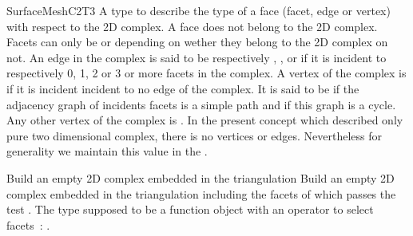 \begin{ccRefConcept}{SurfaceMeshC2T3}
{A type to describe the type of a face (facet, edge or vertex) with respect to 
the 2D complex. A  face does not belong to the 2D complex.
Facets can only be    or 
depending on wether they belong to the 2D complex on not.
An edge in the complex is said to be respectively , 
,
 or 
 if it is incident to respectively 0, 1, 2  or 3 or
more facets in the complex. A vertex of the complex is
 if it is incident incident to no edge of the complex.
It is said to be   
if the adjacency graph of incidents facets 
is a simple path  and  if this graph is  a cycle.
Any other vertex of the complex is .
In the present concept which described only pure two dimensional
complex,
there is no  vertices or edges. Nevertheless for generality
we maintain
this value in the .}


\ccGlue
{}
\ccGlue
{}

\ccGlue
{}
\ccGlue
{}




\ccCreation
{}  %

\ccGlue
{}
 {Build an empty 2D complex embedded in the triangulation }
\ccGlue
{}
{Build an empty 2D complex embedded in the triangulation 
including the facets of  which passes the test .
The type  supposed to be 
a function object with an operator to select facets~:
.}



\end{ccRefConcept}
